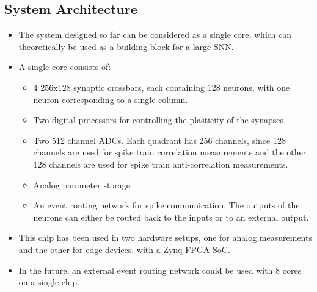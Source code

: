 \documentclass[12pt, letterpaper]{article}
\begin{document}
\subsection*{System Architecture}
\begin{itemize}
    \item The system designed so far can be considered as a single core, which can theoretically be used as a building block for a large SNN.
    \item A single core consists of:
    \begin{itemize}
        \item 4 256x128 synaptic crossbars, each containing 128 neurons, with one neuron corresponding to a single column.
        \item Two digital processors for controlling the plasticity of the synapses.
        \item Two 512 channel ADCs. Each quadrant has 256 channels, since 128 channels are used for spike train correlation measurements and the other 128 channels are used for spike train anti-correlation measurements.
        \item Analog parameter storage
        \item An event routing network for spike communication. The outputs of the neurons can either be routed back to the inputs or to an external output.
    \end{itemize}
    \item This chip has been used in two hardware setups, one for analog measurements and the other for edge devices, with a Zynq FPGA SoC.
    \item In the future, an external event routing network could be used with 8 cores on a single chip.
\end{itemize}
\end{document}
